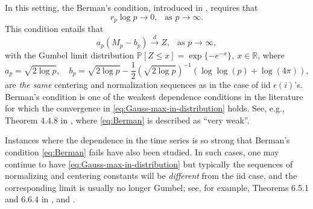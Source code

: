 In this setting, the Berman's condition, introduced in \cite{berman1964limit}, requires that
\begin{equation} \label{eq:Berman}
    r_p \log p \to 0,\ \ \mbox{ as }p\to\infty.
\end{equation}
This condition entails that 
\begin{equation}
    \label{eq:Gauss-max-in-distribution}
  a_p (M_p - b_p) \stackrel{d}{\longrightarrow } Z,\  \ \mbox{ as }p\to\infty,
\end{equation}
with the Gumbel limit distribution $\mathbb P [Z\le x] = \exp\{-e^{-x}\},\ x\in \mathbb R$, 
where 
$$
a_p = \sqrt{2\log p},\quad b_p  = \sqrt{2\log p} - \frac{1}{2}\left(\sqrt{2\log p}\right)^{-1}\left(\log \log (p) + \log(4\pi)\right),
$$ 
are {\em the same} centering and normalization sequences
as in the case of iid $\epsilon(i)$'s.  
Berman's condition is one of the weakest dependence conditions  in the literature for which the convergence in \eqref{eq:Gauss-max-in-distribution} holds. 
See, e.g., Theorem 4.4.8 in \cite{embrechts2013modelling}, where \eqref{eq:Berman} is described as ``very weak''.

Instances where the dependence in the time series is so strong that Berman's condition \eqref{eq:Berman} fails have also been studied.  In such 
cases, one may continue to have \eqref{eq:Gauss-max-in-distribution} but typically the sequences of normalizing and centering constants will be
{\em different} from the iid case, and the corresponding limit is usually no longer Gumbel; see, for example, Theorems 6.5.1 and  6.6.4 in \cite{leadbetter2012extremes}, and \cite{mccormick1976weak}. 

